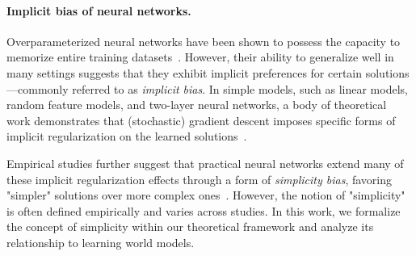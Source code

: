 \paragraph{Implicit bias of neural networks.}
Overparameterized neural networks have been shown to possess the capacity to memorize entire training datasets~\citep{zhang_understanding_2017}. However, their ability to generalize well in many settings suggests that they exhibit implicit preferences for certain solutions—commonly referred to as \emph{implicit bias}. In simple models, such as linear models, random feature models, and two-layer neural networks, a body of theoretical work demonstrates that (stochastic) gradient descent imposes specific forms of implicit regularization on the learned solutions~\citep{soudry_implicit_2018,gunasekar_characterizing_2018,gunasekar_implicit_2018,bartlett_benign_2020,chizat_implicit_2020,lyu_gradient_2021,allen-zhu_towards_2023,andriushchenko_sgd_2023,abbe_generalization_2023,zhang_feature_2024}.

Empirical studies further suggest that practical neural networks extend many of these implicit regularization effects through a form of \emph{simplicity bias}, favoring "simpler" solutions over more complex ones~\citep{perez_deep_2019,kalimeris_sgd_2019,xu2019frequency,bhattamishra_simplicity_2023,huh_low-rank_2023,zhao_m3pl_2024}. However, the notion of "simplicity" is often defined empirically and varies across studies. In this work, we formalize the concept of simplicity within our theoretical framework and analyze its relationship to learning world models.


